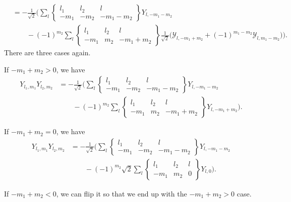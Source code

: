 \documentclass[10pt]{article}
\begin{document}
\begin{itemize}
\begin{align*}
			&= -\frac{1}{\sqrt{2}} \bigg( 
			\sum_{l} \begin{Bmatrix} l_1 & l_2 & l \\ -m_1 & -m_2 & -m_1 - m_2 \end{Bmatrix} Y_{l,-m_1-m_2}  \\
			& \qquad - (-1)^{m_2} \sum_{l} \begin{Bmatrix} l_1 & l_2 & l \\ -m_1 & m_2 & -m_1 + m_2 \end{Bmatrix}
			\frac{1}{\sqrt{2}} \bigg( \mathcal{Y}_{l, -m_1+m_2} + (-1)^{m_1 - m_2} \mathcal{Y}_{l, m_1-m_2} \bigg) \bigg).
		\end{align*}
		There are three cases again.

		If $-m_1+m_2 > 0$, we have
		\begin{align*}
			Y_{l_1, m_1} Y_{l_2, m_2}
			&= -\frac{1}{\sqrt{2}} \bigg( 
			\sum_{l} \begin{Bmatrix} l_1 & l_2 & l \\ -m_1 & -m_2 & -m_1 - m_2 \end{Bmatrix} Y_{l,-m_1-m_2}  \\
			& \qquad - (-1)^{m_2} \sum_{l} \begin{Bmatrix} l_1 & l_2 & l \\ -m_1 & m_2 & -m_1 + m_2 \end{Bmatrix}
			Y_{l,-m_1+m_2} \bigg).
		\end{align*}

		If $-m_1+m_2 = 0$, we have
		\begin{align*}
			Y_{l_1, m_1} Y_{l_2, m_2}
			&= -\frac{1}{\sqrt{2}} \bigg( 
			\sum_{l} \begin{Bmatrix} l_1 & l_2 & l \\ -m_1 & -m_2 & -m_1 - m_2 \end{Bmatrix} Y_{l,-m_1-m_2}  \\
			& \qquad - (-1)^{m_2} \sqrt{2} \sum_{l} \begin{Bmatrix} l_1 & l_2 & l \\ -m_1 & m_2 & 0 \end{Bmatrix}
			Y_{l, 0} \bigg).
		\end{align*}

		If $-m_1+m_2 < 0$, we can flip it so that we end up with the $-m_1+m_2 > 0$ case.


\end{itemize}
\end{document}
